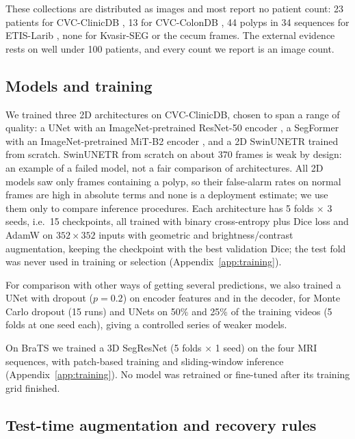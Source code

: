 These collections are distributed as images and most report no patient count: 23 patients for CVC-ClinicDB \cite{vazquez2017endoscene}, 13 for CVC-ColonDB \cite{tudela2024benchmark}, 44 polyps in 34 sequences for ETIS-Larib \cite{bernal2017challenge}, none for Kvasir-SEG or the cecum frames. The external evidence rests on well under 100 patients, and every count we report is an image count.

\subsection{Models and training}
\label{sec:models}
We trained three 2D architectures on CVC-ClinicDB, chosen to span a range of quality: a UNet \cite{ronneberger2015unet} with an ImageNet-pretrained ResNet-50 encoder \cite{he2016resnet}, a SegFormer with an ImageNet-pretrained MiT-B2 encoder \cite{xie2021segformer}, and a 2D SwinUNETR \cite{hatamizadeh2022swinunetr} trained from scratch. SwinUNETR from scratch on about 370 frames is weak by design: an example of a failed model, not a fair comparison of architectures. All 2D models saw only frames containing a polyp, so their false-alarm rates on normal frames are high in absolute terms and none is a deployment estimate; we use them only to compare inference procedures. Each architecture has 5 folds $\times$ 3 seeds, i.e.\ 15 checkpoints, all trained with binary cross-entropy plus Dice loss and AdamW on $352\times352$ inputs with geometric and brightness/contrast augmentation, keeping the checkpoint with the best validation Dice; the test fold was never used in training or selection (Appendix~\ref{app:training}).

For comparison with other ways of getting several predictions, we also trained a UNet with dropout ($p=0.2$) on encoder features and in the decoder, for Monte Carlo dropout \cite{gal2016dropout} (15 runs) and UNets on 50\% and 25\% of the training videos (5 folds at one seed each), giving a controlled series of weaker models.

On BraTS we trained a 3D SegResNet \cite{myronenko2019segresnet} (5 folds $\times$ 1 seed) on the four MRI sequences, with patch-based training and sliding-window inference (Appendix~\ref{app:training}). No model was retrained or fine-tuned after its training grid finished.

\subsection{Test-time augmentation and recovery rules}
\label{sec:tta}
